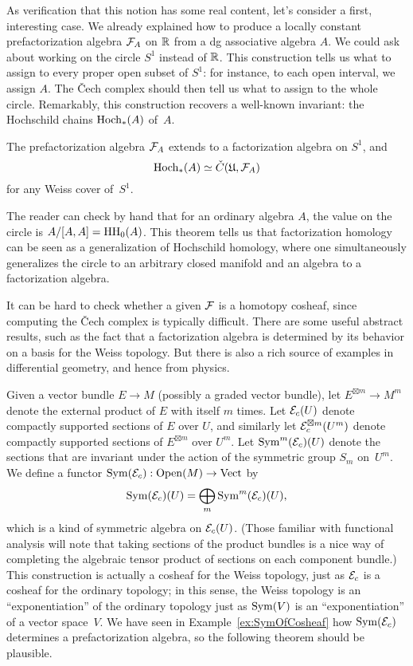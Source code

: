 \documentclass[11pt]{amsart}
\def\Open{\operatorname{Open}}
\def\Vect{\operatorname{Vect}}
\def\owen#1{{\textcolor{violet!65!black}{OG: {#1}}}}
\begin{document}
As verification that this notion has some real content, let's consider a first, interesting case.
We already explained how to produce a locally constant prefactorization algebra $\mathcal F_A$ on $\mathbb R$ from a dg associative algebra $A$.
We could ask about working on the circle $S^1$ instead of $\mathbb R$.
This construction tells us what to assign to every proper open subset of $S^1$: for instance, to each open interval, we assign $A$.
The \v{C}ech complex should then tell us what to assign to the whole circle.
Remarkably, this construction recovers a well-known invariant: the Hochschild chains ${\rm Hoch}_*(A)$ of~$A$.

\begin{thm}[\owen{citations}]
The prefactorization algebra $\mathcal F_A$ extends to a factorization algebra on $S^1$, and
\[
{\rm Hoch}_*(A) \simeq \check{C}(\mathfrak{U},\mathcal F_A)
\]
for any Weiss cover of~$S^1$.
\end{thm}

The reader can check by hand that for an ordinary algebra $A$, the value on the circle is $A/[A,A] = {\rm HH}_0(A)$.
This theorem tells us that factorization homology can be seen as a generalization of Hochschild homology,
where one simultaneously generalizes the circle to an arbitrary closed manifold and an algebra to a factorization algebra.

It can be hard to check whether a given $\mathcal F$ is a homotopy cosheaf, since computing the \v{C}ech complex is typically difficult.
There are some useful abstract results, such as the fact that a factorization algebra is determined by its behavior on a basis for the Weiss topology.
But there is also a rich source of examples in differential geometry, and hence from physics.

Given a vector bundle $E \to M$ (possibly a graded vector bundle), 
let $E^{\boxtimes m} \to M^m$ denote the external product of $E$ with itself $m$ times.
Let $\mathcal E_c(U)$ denote compactly supported sections of $E$ over $U$, 
and similarly let $\mathcal E^{\boxtimes m}_c(U^m)$ denote compactly supported sections of $E^{\boxtimes m}$ over $U^m$.
Let $\operatorname{Sym}^m(\mathcal E_c)(U)$ denote the sections that are invariant under the action of the symmetric group $S_m$ on~$U^m$.
We define a functor $\Sym(\cE_c): \Open(M) \to \Vect$ by
\[
\operatorname{Sym}(\mathcal E_c)(U) = \bigoplus_m \operatorname{Sym}^m(\mathcal E_c)(U),
\]
which is a kind of symmetric algebra on $\mathcal E_c(U)$.
(Those familiar with functional analysis will note that taking sections of the product bundles is a nice way of completing the algebraic tensor product of sections on each component bundle.)
This construction is actually a cosheaf for the Weiss topology, just as $\mathcal E_c$ is a cosheaf for the ordinary topology;
in this sense, the Weiss topology is an ``exponentiation'' of the ordinary topology just as $\operatorname{Sym}(V)$ is an ``exponentiation'' of a vector space~$V$.
We have seen in Example~\ref{ex:SymOfCosheaf} how $\operatorname{Sym}(\mathcal E_c)$ determines a prefactorization algebra,
so the following theorem should be plausible.
\end{document}
